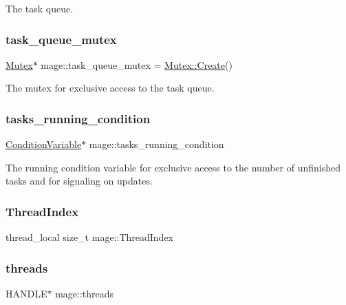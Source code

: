 The task queue. \hypertarget{namespacemage_a7de4544ddddcf8e0d54dbfdc0778f13f}{}\label{namespacemage_a7de4544ddddcf8e0d54dbfdc0778f13f} 
\subsubsection{\texorpdfstring{task\+\_\+queue\+\_\+mutex}{task\_queue\_mutex}}
{\footnotesize\ttfamily \hyperlink{classmage_1_1_mutex}{Mutex}$\ast$ mage\+::task\+\_\+queue\+\_\+mutex = \hyperlink{classmage_1_1_mutex_a48d784fa6bffd4088d9f89a2a9cca84e}{Mutex\+::\+Create}()\hspace{0.3cm}{\ttfamily [static]}}

The mutex for exclusive access to the task queue. \hypertarget{namespacemage_a8c04b4285ebbc0fb416b1905c01cf149}{}\label{namespacemage_a8c04b4285ebbc0fb416b1905c01cf149} 
\subsubsection{\texorpdfstring{tasks\+\_\+running\+\_\+condition}{tasks\_running\_condition}}
{\footnotesize\ttfamily \hyperlink{classmage_1_1_condition_variable}{Condition\+Variable}$\ast$ mage\+::tasks\+\_\+running\+\_\+condition\hspace{0.3cm}{\ttfamily [static]}}

The running condition variable for exclusive access to the number of unfinished tasks and for signaling on updates. \hypertarget{namespacemage_aacfaaced796400d312a5d2cc43b5b09a}{}\label{namespacemage_aacfaaced796400d312a5d2cc43b5b09a} 
\subsubsection{\texorpdfstring{Thread\+Index}{ThreadIndex}}
{\footnotesize\ttfamily thread\+\_\+local size\+\_\+t mage\+::\+Thread\+Index}

\hypertarget{namespacemage_a15e9f7d36194ec1b768a82a2294cce6c}{}\label{namespacemage_a15e9f7d36194ec1b768a82a2294cce6c} 
\subsubsection{\texorpdfstring{threads}{threads}}
{\footnotesize\ttfamily H\+A\+N\+D\+LE$\ast$ mage\+::threads\hspace{0.3cm}{\ttfamily [static]}}

